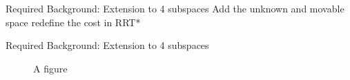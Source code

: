 
\begin{frame}[fragile]{Required Background: Extension to 4 subspaces} %
  Add the unknown and movable space
  redefine the cost in RRT*
\end{frame}


\begin{frame}[fragile]{Required Background: Extension to 4 subspaces} %

\begin{center}
\begin{figure}[H]
  \centering
  \qquad
  \qquad
\caption{A figure}
\end{figure}
\end{center}

\end{frame}





